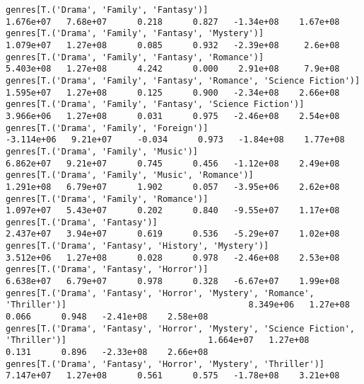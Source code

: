 \documentclass[11pt]{article}
\begin{document}
\begin{Verbatim}[commandchars=\\\{\}]
genres[T.('Drama', 'Family', 'Fantasy')]                                                                      1.676e+07   7.68e+07      0.218      0.827   -1.34e+08    1.67e+08
genres[T.('Drama', 'Family', 'Fantasy', 'Mystery')]                                                           1.079e+07   1.27e+08      0.085      0.932   -2.39e+08     2.6e+08
genres[T.('Drama', 'Family', 'Fantasy', 'Romance')]                                                           5.403e+08   1.27e+08      4.242      0.000    2.91e+08     7.9e+08
genres[T.('Drama', 'Family', 'Fantasy', 'Romance', 'Science Fiction')]                                        1.595e+07   1.27e+08      0.125      0.900   -2.34e+08    2.66e+08
genres[T.('Drama', 'Family', 'Fantasy', 'Science Fiction')]                                                   3.966e+06   1.27e+08      0.031      0.975   -2.46e+08    2.54e+08
genres[T.('Drama', 'Family', 'Foreign')]                                                                     -3.114e+06   9.21e+07     -0.034      0.973   -1.84e+08    1.77e+08
genres[T.('Drama', 'Family', 'Music')]                                                                        6.862e+07   9.21e+07      0.745      0.456   -1.12e+08    2.49e+08
genres[T.('Drama', 'Family', 'Music', 'Romance')]                                                             1.291e+08   6.79e+07      1.902      0.057   -3.95e+06    2.62e+08
genres[T.('Drama', 'Family', 'Romance')]                                                                      1.097e+07   5.43e+07      0.202      0.840   -9.55e+07    1.17e+08
genres[T.('Drama', 'Fantasy')]                                                                                2.437e+07   3.94e+07      0.619      0.536   -5.29e+07    1.02e+08
genres[T.('Drama', 'Fantasy', 'History', 'Mystery')]                                                          3.512e+06   1.27e+08      0.028      0.978   -2.46e+08    2.53e+08
genres[T.('Drama', 'Fantasy', 'Horror')]                                                                      6.638e+07   6.79e+07      0.978      0.328   -6.67e+07    1.99e+08
genres[T.('Drama', 'Fantasy', 'Horror', 'Mystery', 'Romance', 'Thriller')]                                    8.349e+06   1.27e+08      0.066      0.948   -2.41e+08    2.58e+08
genres[T.('Drama', 'Fantasy', 'Horror', 'Mystery', 'Science Fiction', 'Thriller')]                            1.664e+07   1.27e+08      0.131      0.896   -2.33e+08    2.66e+08
genres[T.('Drama', 'Fantasy', 'Horror', 'Mystery', 'Thriller')]                                               7.147e+07   1.27e+08      0.561      0.575   -1.78e+08    3.21e+08

\end{Verbatim}
\end{document}
